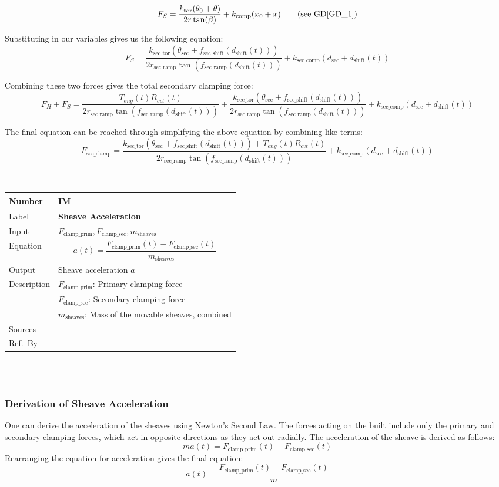 \documentclass[12pt]{article}
\newcommand{\colAwidth}{0.13\textwidth}
\newcommand{\colBwidth}{0.82\textwidth}
\newcommand{\dref}[1]{GD\ref{#1}}
\newcounter{instnum} %
\newcommand{\definstance}[7] {
~\newline
\noindent
\begin{minipage}{\textwidth}
\renewcommand*{\arraystretch}{1.5}
\begin{tabular}{| p{\colAwidth} | p{\colBwidth}|}
  \hline
  \rowcolor[gray]{0.9}
  Number& IM\refstepcounter{instnum}\theinstnum \label{inst:\theinstnum}\\
  \hline
  Label& \bf #1 \\
  \hline
  Input& #2\\
  \hline
  Equation& #3\\
  \hline
  Output& #4\\
  \hline
  Description& #5 \\
  \hline
  Sources& #6 \\
  \hline
  Ref.\ By & #7\\
  \hline
\end{tabular}
\end{minipage}\\
}
\begin{document}
\[
F_S = \frac{k_{\text{tor}}(\theta_0 + \theta)}{2r\tan(\beta)} + k_\text{comp}(x_0 + x) \tag*{\text{(see \dref{GD_1})}} %
\]

Substituting in our variables gives us the following equation:
\[
F_S = \frac{k_{\text{sec\_tor}} (\theta_{\text{sec}} + f_{\text{sec\_shift}}(d_\text{shift}(t)))}{2 r_{\text{sec\_ramp}} \tan(f_{\text{sec\_ramp}}(d_\text{shift}(t)))} + k_{\text{sec\_comp}} (d_{\text{sec}} + d_\text{shift}(t))
\]

Combining these two forces gives the total secondary clamping force:
\[
F_H + F_S = \frac{T_{eng}(t) R_{cvt}(t)}{2 r_{\text{sec\_ramp}} \tan(f_{\text{sec\_ramp}}(d_\text{shift}(t)))} + \frac{k_{\text{sec\_tor}} (\theta_{\text{sec}} + f_{\text{sec\_shift}}(d_\text{shift}(t)))}{2 r_{\text{sec\_ramp}} \tan(f_{\text{sec\_ramp}}(d_\text{shift}(t)))} + k_{\text{sec\_comp}} (d_{\text{sec}} + d_\text{shift}(t))
\]

The final equation can be reached through simplifying the above equation by combining like terms:
\[
F_{\text{sec\_clamp}} = \frac{k_{\text{sec\_tor}} (\theta_{\text{sec}} + f_{\text{sec\_shift}}(d_\text{shift}(t))) + T_{eng}(t) R_{cvt}(t)}{2 r_{\text{sec\_ramp}} \tan(f_{\text{sec\_ramp}}(d_\text{shift}(t)))} + k_{\text{sec\_comp}} (d_{\text{sec}} + d_\text{shift}(t))
\]

\definstance
{Sheave Acceleration}
{$F_{\text{clamp\_prim}}, F_{\text{clamp\_sec}}, m_\text{sheaves}$} %
{\[a(t) = \frac{F_{\text{clamp\_prim}}(t) - F_{\text{clamp\_sec}}(t)}{m_\text{sheaves}}\]} %
{Sheave acceleration $a$} %
{$F_{\text{clamp\_prim}}$: Primary clamping force\\
  &$F_{\text{clamp\_sec}}$: Secondary clamping force\\
  &$m_\text{sheaves}$: Mass of the movable sheaves, combined} %
{} %
{-}
{} %
{} %
{-}

\subsubsection*{Derivation of Sheave Acceleration}
One can derive the acceleration of the sheaves using \hyperref[TM:N2]{Newton's Second Law}. The forces acting on the built include 
only the primary and secondary clamping forces, which act in opposite directions as they act out radially.
The acceleration of the sheave is derived as follows:
\[ma(t) = F_{\text{clamp\_prim}}(t) - F_{\text{clamp\_sec}}(t)\]
Rearranging the equation for acceleration gives the final equation:
\[a(t) = \frac{F_{\text{clamp\_prim}}(t) - F_{\text{clamp\_sec}}(t)}{m}\]
\end{document}
